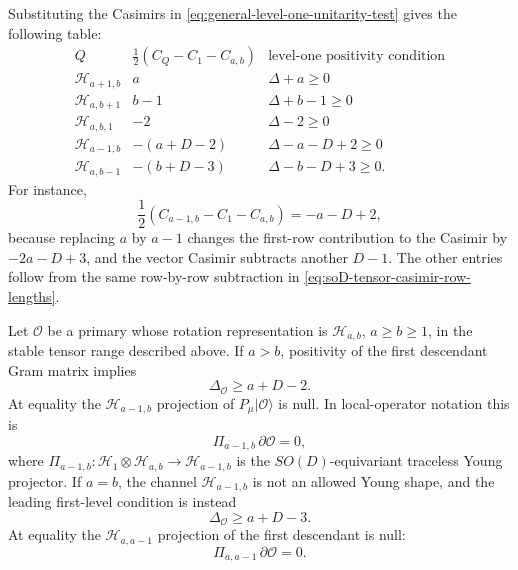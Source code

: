Substituting the Casimirs in
\eqref{eq:general-level-one-unitarity-test} gives the following table:
\begin{equation}
\begin{array}{c|c|c}
  Q
  &
  \frac12(C_Q-C_1-C_{a,b})
  &
  \text{level-one positivity condition}
  \\ \hline
  \mathcal H_{a+1,b}
  &
  a
  &
  \Delta+a\ge0
  \\
  \mathcal H_{a,b+1}
  &
  b-1
  &
  \Delta+b-1\ge0
  \\
  \mathcal H_{a,b,1}
  &
  -2
  &
  \Delta-2\ge0
  \\
  \mathcal H_{a-1,b}
  &
  -(a+D-2)
  &
  \Delta-a-D+2\ge0
  \\
  \mathcal H_{a,b-1}
  &
  -(b+D-3)
  &
  \Delta-b-D+3\ge0 .
\end{array}
\label{eq:two-row-level-one-bound-table}
\end{equation}
For instance,
\[
  \frac12(C_{a-1,b}-C_1-C_{a,b})
  =
  -a-D+2,
\]
because replacing \(a\) by \(a-1\) changes the first-row contribution to the
Casimir by \(-2a-D+3\), and the vector Casimir subtracts another \(D-1\).
The other entries follow from the same row-by-row subtraction in
\eqref{eq:soD-tensor-casimir-row-lengths}.

\begin{proposition}
\label{prop:two-row-mixed-symmetry-unitarity-bound}
Let \(\mathcal O\) be a primary whose rotation representation is
\(\mathcal H_{a,b}\), \(a\ge b\ge1\), in the stable tensor range described
above.  If \(a>b\), positivity of the first descendant Gram matrix implies
\begin{equation}
  \Delta_{\mathcal O}\ge a+D-2.
  \label{eq:two-row-nonrectangular-bound}
\end{equation}
At equality the \(\mathcal H_{a-1,b}\) projection of
\(P_\mu|\mathcal O\rangle\) is null.  In local-operator notation this is
\begin{equation}
  \Pi_{a-1,b}\,\partial\mathcal O=0,
  \label{eq:two-row-nonrectangular-shortening}
\end{equation}
where \(\Pi_{a-1,b}:\mathcal H_1\otimes\mathcal H_{a,b}\to
\mathcal H_{a-1,b}\) is the \(SO(D)\)-equivariant traceless Young projector.
If \(a=b\), the channel \(\mathcal H_{a-1,b}\) is not an allowed Young shape,
and the leading first-level condition is instead
\begin{equation}
  \Delta_{\mathcal O}\ge a+D-3.
  \label{eq:two-row-rectangular-bound}
\end{equation}
At equality the \(\mathcal H_{a,a-1}\) projection of the first descendant is
null:
\begin{equation}
  \Pi_{a,a-1}\,\partial\mathcal O=0.
  \label{eq:two-row-rectangular-shortening}
\end{equation}
\end{proposition}

